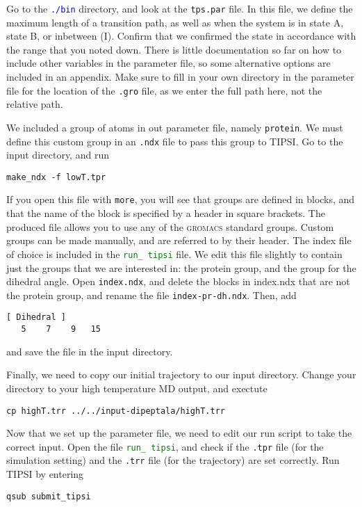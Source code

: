 \documentclass[]{article}
\begin{document}
Go to the \textcolor{blue}{\texttt{./bin}} directory, and look at the \texttt{tps.par} file. In this file, we define the maximum length of a transition path, as well as when the system is in state A, state B, or inbetween (I). Confirm that we confirmed the state in accordance with the range that you noted down. There is little documentation so far on how to include other variables in the parameter file, so some alternative options are included in an appendix. Make sure to fill in your own directory in the parameter file for the location of the \texttt{.gro} file, as we enter the full path here, not the relative path.

We included a group of atoms in out parameter file, namely \texttt{protein}. We must define this custom group in an \texttt{.ndx} file to pass this group to TIPSI. Go to the input directory, and run
%
\begin{lstlisting}
make_ndx -f lowT.tpr
\end{lstlisting}
%
If you open this file with \texttt{more}, you will see that groups are defined in blocks, and that the name of the block is specified by a header in square brackets. The produced file allows you to use any of the \textsc{gromacs} standard groups. Custom groups can be made manually, and are referred to by their header. The index file of choice is included in the \textcolor{green}{\texttt{run\_ tipsi}} file. We edit this file slightly to contain just the groups that we are interested in: the protein group, and the group for the dihedral angle. Open \texttt{index.ndx}, and delete the blocks in index.ndx that are not the protein group, and rename the file \texttt{index-pr-dh.ndx}. Then, add
%
\begin{lstlisting}
[ Dihedral ]
   5    7    9   15
\end{lstlisting}
%
and save the file in the input directory.

Finally, we need to copy our initial trajectory to our input directory. Change your directory to your high temperature MD output, and exectute 
%
\begin{lstlisting}
cp highT.trr ../../input-dipeptala/highT.trr
\end{lstlisting}
%

Now that we set up the parameter file, we need to edit our run script to take the correct input. Open the file \textcolor{green}{\texttt{run\_ tipsi}}, and check if the \texttt{.tpr} file (for the simulation setting) and the \texttt{.trr} file (for the trajectory) are set correctly. Run \textsc{TIPSI} by entering
%
\begin{lstlisting}
qsub submit_tipsi
\end{lstlisting}
%
\end{document}
